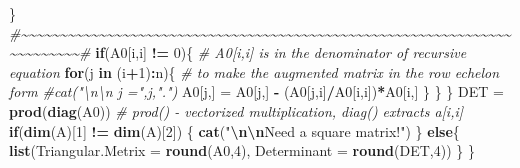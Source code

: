 \documentclass[
]{book}
\newenvironment{Shaded}{\begin{snugshade}}{\end{snugshade}}
\newcommand{\AttributeTok}[1]{\textcolor[rgb]{0.13,0.29,0.53}{#1}}
\newcommand{\CommentTok}[1]{\textcolor[rgb]{0.56,0.35,0.01}{\textit{#1}}}
\newcommand{\ControlFlowTok}[1]{\textcolor[rgb]{0.13,0.29,0.53}{\textbf{#1}}}
\newcommand{\DecValTok}[1]{\textcolor[rgb]{0.00,0.00,0.81}{#1}}
\newcommand{\FunctionTok}[1]{\textcolor[rgb]{0.13,0.29,0.53}{\textbf{#1}}}
\newcommand{\NormalTok}[1]{#1}
\newcommand{\OtherTok}[1]{\textcolor[rgb]{0.56,0.35,0.01}{#1}}
\newcommand{\SpecialCharTok}[1]{\textcolor[rgb]{0.81,0.36,0.00}{\textbf{#1}}}
\newcommand{\StringTok}[1]{\textcolor[rgb]{0.31,0.60,0.02}{#1}}
\begin{document}
\begin{Shaded}
\begin{Highlighting}[]
\NormalTok{      \}}
      \CommentTok{\#\textasciitilde{}\textasciitilde{}\textasciitilde{}\textasciitilde{}\textasciitilde{}\textasciitilde{}\textasciitilde{}\textasciitilde{}\textasciitilde{}\textasciitilde{}\textasciitilde{}\textasciitilde{}\textasciitilde{}\textasciitilde{}\textasciitilde{}\textasciitilde{}\textasciitilde{}\textasciitilde{}\textasciitilde{}\textasciitilde{}\textasciitilde{}\textasciitilde{}\textasciitilde{}\textasciitilde{}\textasciitilde{}\textasciitilde{}\textasciitilde{}\textasciitilde{}\textasciitilde{}\textasciitilde{}\textasciitilde{}\textasciitilde{}\textasciitilde{}\textasciitilde{}\textasciitilde{}\textasciitilde{}\textasciitilde{}\textasciitilde{}\textasciitilde{}\textasciitilde{}\textasciitilde{}\textasciitilde{}\textasciitilde{}\textasciitilde{}\textasciitilde{}\textasciitilde{}\textasciitilde{}\textasciitilde{}\textasciitilde{}\textasciitilde{}\textasciitilde{}\textasciitilde{}\textasciitilde{}\textasciitilde{}\textasciitilde{}\textasciitilde{}\textasciitilde{}\textasciitilde{}\textasciitilde{}\textasciitilde{}\textasciitilde{}\textasciitilde{}\textasciitilde{}\textasciitilde{}\textasciitilde{}\textasciitilde{}\textasciitilde{}\textasciitilde{}\textasciitilde{}\textasciitilde{}\textasciitilde{}\textasciitilde{}\#}
       \ControlFlowTok{if}\NormalTok{(A0[i,i] }\SpecialCharTok{!=} \DecValTok{0}\NormalTok{)\{    }\CommentTok{\# A0[i,i] is in the denominator of recursive equation}
          \ControlFlowTok{for}\NormalTok{(j }\ControlFlowTok{in}\NormalTok{ (i}\SpecialCharTok{+}\DecValTok{1}\NormalTok{)}\SpecialCharTok{:}\NormalTok{n)\{  }\CommentTok{\# to make the augmented matrix in the row echelon form}
             \CommentTok{\#cat("\textbackslash{}n\textbackslash{}n j =",j,".")}
\NormalTok{             A0[j,] }\OtherTok{=}\NormalTok{ A0[j,] }\SpecialCharTok{{-}}\NormalTok{ (A0[j,i]}\SpecialCharTok{/}\NormalTok{A0[i,i])}\SpecialCharTok{*}\NormalTok{A0[i,]}
\NormalTok{           \}}
\NormalTok{        \}}
\NormalTok{      \}}
\NormalTok{     DET }\OtherTok{=} \FunctionTok{prod}\NormalTok{(}\FunctionTok{diag}\NormalTok{(A0))    }\CommentTok{\# prod() {-} vectorized multiplication, diag() extracts a[i,i]}
     \ControlFlowTok{if}\NormalTok{(}\FunctionTok{dim}\NormalTok{(A)[}\DecValTok{1}\NormalTok{] }\SpecialCharTok{!=} \FunctionTok{dim}\NormalTok{(A)[}\DecValTok{2}\NormalTok{]) \{}
        \FunctionTok{cat}\NormalTok{(}\StringTok{"}\SpecialCharTok{\textbackslash{}n\textbackslash{}n}\StringTok{Need a square matrix!"}\NormalTok{)}
\NormalTok{      \} }\ControlFlowTok{else}\NormalTok{\{}
       \FunctionTok{list}\NormalTok{(}\AttributeTok{Triangular.Metrix =} \FunctionTok{round}\NormalTok{(A0,}\DecValTok{4}\NormalTok{), }\AttributeTok{Determinant =} \FunctionTok{round}\NormalTok{(DET,}\DecValTok{4}\NormalTok{))}
\NormalTok{      \}}
\NormalTok{ \}}
\end{Highlighting}
\end{Shaded}
\end{document}
